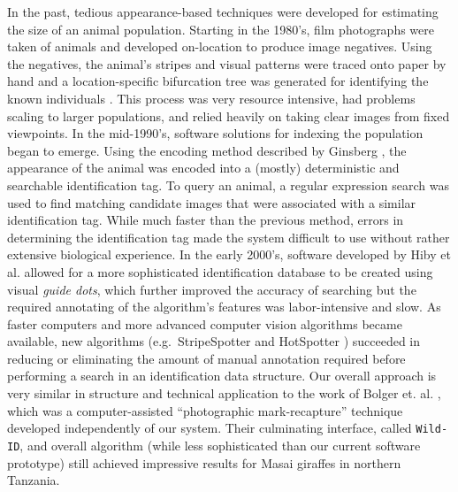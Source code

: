 In the past, tedious appearance-based techniques were developed for estimating the size of an animal population.  Starting in the 1980's, film photographs were taken of animals and developed on-location to produce image negatives.  Using the negatives, the animal's stripes and visual patterns were traced onto paper by hand and a location-specific bifurcation tree was generated for identifying the known individuals  \cite{ginsberg_social_1988}.  This process was very resource intensive, had problems scaling to larger populations, and relied heavily on taking clear images from fixed viewpoints.  In the mid-1990's, software solutions for indexing the population began to emerge.  Using the encoding method described by Ginsberg \cite{ginsberg_social_1988}, the appearance of the animal was encoded into a (mostly) deterministic and searchable identification tag.  To query an animal, a regular expression search was used to find matching candidate images that were associated with a similar identification tag.  While much faster than the previous method, errors in determining the identification tag made the system difficult to use without rather extensive biological experience.  In the early 2000's, software developed by Hiby et al.  \cite{hiby_computer_1990, hiby_analysis_2013} allowed for a more sophisticated identification database to be created using visual \textit{guide dots}, which further improved the accuracy of searching but the required annotating of the algorithm's features was labor-intensive and slow.  As faster computers and more advanced computer vision algorithms became available, new algorithms (e.g.\ StripeSpotter \cite{lahiri_biometric_2011} and HotSpotter \cite{crall_hotspotter_2013}) succeeded in reducing or eliminating the amount of manual annotation required before performing a search in an identification data structure.  Our overall approach is very similar in structure and technical application to the work of Bolger et. al. \cite{bolger_computer-assisted_2012}, which was a computer-assisted ``photographic mark-recapture'' technique developed independently of our system.  Their culminating interface, called \texttt{Wild-ID}, and overall algorithm (while less sophisticated than our current software prototype) still achieved impressive results for Masai giraffes in northern Tanzania.


